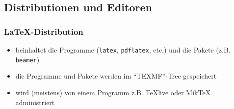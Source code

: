 \documentclass[handout,11pt]{beamer}
\begin{document}






\subsection{Distributionen und Editoren}
\label{sec:dist-editor}

\begin{frame}
  \frametitle{\LaTeX -Distribution}

  \begin{itemize}[<+->]
    \item beinhaltet die Programme (\texttt{latex}, \texttt{pdflatex},
      etc.) und die Pakete (z.\thinspace B. \texttt{beamer})
    \item die Programme und Pakete werden im \enquote{TEXMF}-Tree
      gespeichert
    \item wird (meistens) von einem Programm z.\thinspace B. TeXlive
      oder MikTeX administriert
  \end{itemize}

\end{frame}
\end{document}
